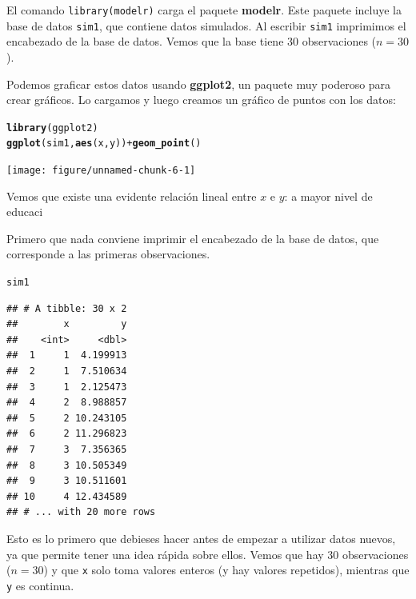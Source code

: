 \documentclass{article}\usepackage[]{graphicx}\usepackage[]{color}
\makeatletter
\newcommand{\hlopt}[1]{\textcolor[rgb]{0,0,0}{#1}}%
\newcommand{\hlstd}[1]{\textcolor[rgb]{0.345,0.345,0.345}{#1}}%
\newcommand{\hlkwd}[1]{\textcolor[rgb]{0.737,0.353,0.396}{\textbf{#1}}}%
\newenvironment{kframe}{%
 \def\at@end@of@kframe{}%
 \ifinner\ifhmode%
  \def\at@end@of@kframe{\end{minipage}}%
  \begin{minipage}{\columnwidth}%
 \fi\fi%
 \def\FrameCommand##1{\hskip\@totalleftmargin \hskip-\fboxsep
 \colorbox{shadecolor}{##1}\hskip-\fboxsep
     \hskip-\linewidth \hskip-\@totalleftmargin \hskip\columnwidth}%
 \MakeFramed {\advance\hsize-\width
   \@totalleftmargin\z@ \linewidth\hsize
   \@setminipage}}%
 {\par\unskip\endMakeFramed%
 \at@end@of@kframe}
\newenvironment{knitrout}{}{} %
\newcommand*{\paq}[1]{\textbf{#1}}
\makeatother
\begin{document}
El comando \verb|library(modelr)| carga el paquete \paq{modelr}. Este paquete incluye la base de datos \verb|sim1|, que contiene datos simulados. Al escribir \verb|sim1| imprimimos el encabezado de la base de datos. Vemos que la base tiene 30 observaciones ($n=30$).

Podemos graficar estos datos usando \paq{ggplot2}, un paquete muy poderoso para crear gráficos. Lo cargamos y luego creamos un gráfico de puntos con los datos:

\begin{knitrout}
\color{fgcolor}\begin{kframe}
\begin{alltt}
\hlkwd{library}\hlstd{(ggplot2)}
\hlkwd{ggplot}\hlstd{(sim1,} \hlkwd{aes}\hlstd{(x, y))} \hlopt{+} \hlkwd{geom_point}\hlstd{()}
\end{alltt}
\end{kframe}

{\centering \texttt{[image: figure/unnamed-chunk-6-1]} 

}



\end{knitrout}

Vemos que existe una evidente relación lineal entre $x$ e $y$: a mayor nivel de educaci

Primero que nada conviene imprimir el encabezado de la base de datos, que corresponde a las primeras observaciones.

\begin{knitrout}
\color{fgcolor}\begin{kframe}
\begin{alltt}
\hlstd{sim1}
\end{alltt}
\begin{verbatim}
## # A tibble: 30 x 2
##        x         y
##    <int>     <dbl>
##  1     1  4.199913
##  2     1  7.510634
##  3     1  2.125473
##  4     2  8.988857
##  5     2 10.243105
##  6     2 11.296823
##  7     3  7.356365
##  8     3 10.505349
##  9     3 10.511601
## 10     4 12.434589
## # ... with 20 more rows
\end{verbatim}
\end{kframe}
\end{knitrout}

Esto es lo primero que debieses hacer antes de empezar a utilizar datos nuevos, ya que permite tener una idea rápida sobre ellos. Vemos que hay 30 observaciones ($n=30$) y que \verb|x| solo toma valores enteros (y hay valores repetidos), mientras que \verb|y| es continua.
\end{document}
